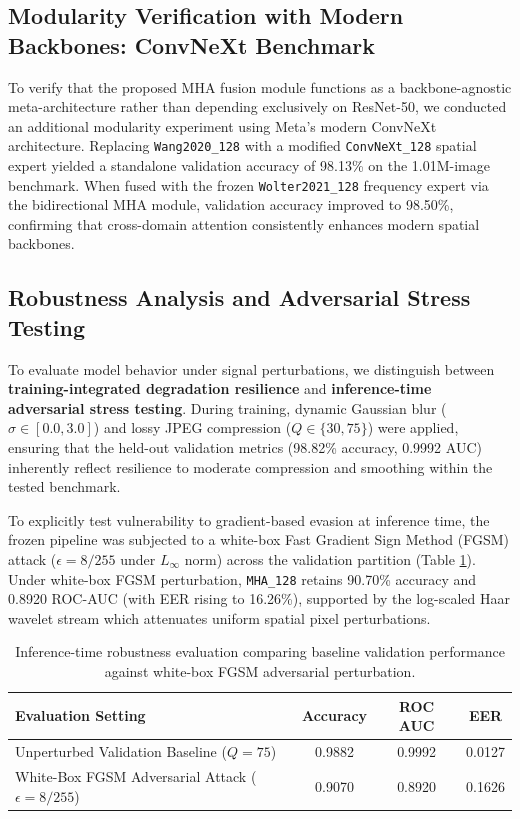 \documentclass[fleqn,10pt]{wlscirep}
\begin{document}
\subsection*{Modularity Verification with Modern Backbones: ConvNeXt Benchmark}
To verify that the proposed MHA fusion module functions as a backbone-agnostic meta-architecture rather than depending exclusively on ResNet-50, we conducted an additional modularity experiment using Meta's modern ConvNeXt architecture. Replacing \texttt{Wang2020\_128} with a modified \texttt{ConvNeXt\_128} spatial expert yielded a standalone validation accuracy of 98.13\% on the 1.01M-image benchmark. When fused with the frozen \texttt{Wolter2021\_128} frequency expert via the bidirectional MHA module, validation accuracy improved to 98.50\%, confirming that cross-domain attention consistently enhances modern spatial backbones.

\subsection*{Robustness Analysis and Adversarial Stress Testing}
To evaluate model behavior under signal perturbations, we distinguish between \textbf{training-integrated degradation resilience} and \textbf{inference-time adversarial stress testing}. During training, dynamic Gaussian blur ($\sigma \in [0.0, 3.0]$) and lossy JPEG compression ($Q \in \{30, 75\}$) were applied, ensuring that the held-out validation metrics (98.82\% accuracy, 0.9992 AUC) inherently reflect resilience to moderate compression and smoothing within the tested benchmark.

To explicitly test vulnerability to gradient-based evasion at inference time, the frozen pipeline was subjected to a white-box Fast Gradient Sign Method (FGSM) attack ($\epsilon = 8/255$ under $L_\infty$ norm) across the validation partition (Table \ref{tab:fgsm_robustness}). Under white-box FGSM perturbation, \texttt{MHA\_128} retains 90.70\% accuracy and 0.8920 ROC-AUC (with EER rising to 16.26\%), supported by the log-scaled Haar wavelet stream which attenuates uniform spatial pixel perturbations.

\begin{table}[htbp]
\centering
\begin{tabular}{|l|c|c|c|}
\hline
\textbf{Evaluation Setting} & \textbf{Accuracy} & \textbf{ROC AUC} & \textbf{EER} \\ \hline
Unperturbed Validation Baseline ($Q=75$) & 0.9882 & 0.9992 & 0.0127 \\ \hline
White-Box FGSM Adversarial Attack ($\epsilon = 8/255$) & 0.9070 & 0.8920 & 0.1626 \\ \hline
\end{tabular}
\caption{Inference-time robustness evaluation comparing baseline validation performance against white-box FGSM adversarial perturbation.}
\label{tab:fgsm_robustness}
\end{table}
\end{document}
